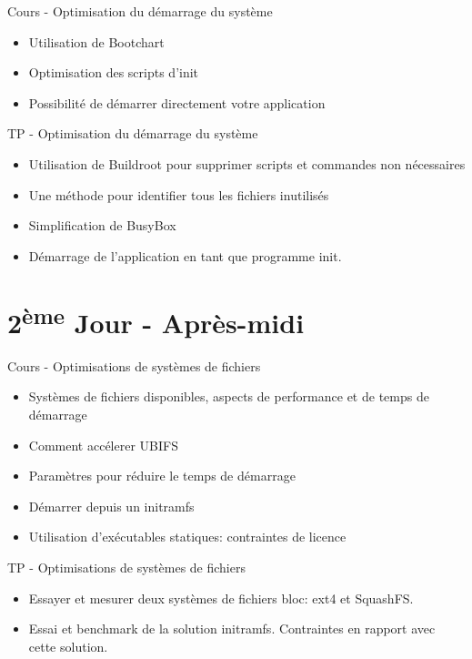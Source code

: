 \documentclass[a4paper,12pt,obeyspaces,spaces,hyphens]{article}
\begin{document}
\feagendatwocolumn
{Cours - Optimisation du démarrage du système}
{
  \begin{itemize}
  \item Utilisation de Bootchart
  \item Optimisation des scripts d'init
  \item Possibilité de démarrer directement votre application
  \end{itemize}
}
{TP - Optimisation du démarrage du système}
{
 \begin{itemize}
 \item Utilisation de Buildroot pour supprimer scripts et commandes non nécessaires
 \item Une méthode pour identifier tous les fichiers inutilisés
 \item Simplification de BusyBox
 \item Démarrage de l'application en tant que programme init.
 \end{itemize}
}

\section{2\textsuperscript{ème} Jour - Après-midi}

\feagendatwocolumn
{Cours - Optimisations de systèmes de fichiers}
{
  \begin{itemize}
  \item Systèmes de fichiers disponibles, aspects de performance et de temps de démarrage
  \item Comment accélerer UBIFS
  \item Paramètres pour réduire le temps de démarrage
  \item Démarrer depuis un initramfs
  \item Utilisation d'exécutables statiques: contraintes de licence
  \end{itemize}
}
{TP - Optimisations de systèmes de fichiers}
{
 \begin{itemize}
 \item Essayer et mesurer deux systèmes de fichiers bloc: ext4 et SquashFS.
 \item Essai et benchmark de la solution initramfs. Contraintes
       en rapport avec cette solution.
 \end{itemize}
}
\end{document}
